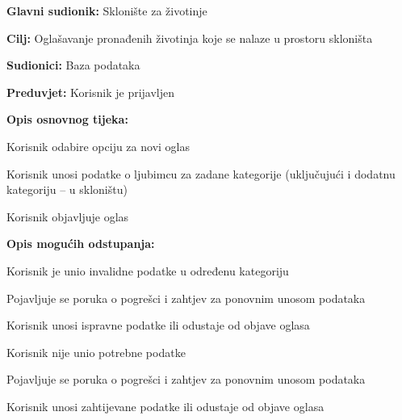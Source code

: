 \noindent {}
\begin{packed_item}

	\item \textbf{Glavni sudionik: }Sklonište za životinje
	\item  \textbf{Cilj:} Oglašavanje pronađenih životinja koje se nalaze u prostoru skloništa
	\item  \textbf{Sudionici:} Baza podataka
	\item  \textbf{Preduvjet:} Korisnik je prijavljen
	\item  \textbf{Opis osnovnog tijeka:}

	\item[] \begin{packed_enum}

		\item Korisnik odabire opciju za novi oglas
		\item Korisnik unosi podatke o ljubimcu za zadane kategorije (uključujući i dodatnu kategoriju – u skloništu)
		\item Korisnik objavljuje oglas
	\end{packed_enum}

	\item  \textbf{Opis mogućih odstupanja:}

	\item[] \begin{packed_item}

		\item[2.a] Korisnik je unio invalidne podatke u određenu kategoriju
		\item[] \begin{packed_enum}

			\item Pojavljuje se poruka o pogrešci i zahtjev za ponovnim unosom podataka
			\item Korisnik unosi ispravne podatke ili odustaje od objave oglasa

		\end{packed_enum}
		\item[2.b] Korisnik nije unio potrebne podatke
		\item[] \begin{packed_enum}

			\item Pojavljuje se poruka o pogrešci i zahtjev za ponovnim unosom podataka
			\item Korisnik unosi zahtijevane podatke ili odustaje od objave oglasa

		\end{packed_enum}
	\end{packed_item}
\end{packed_item}



